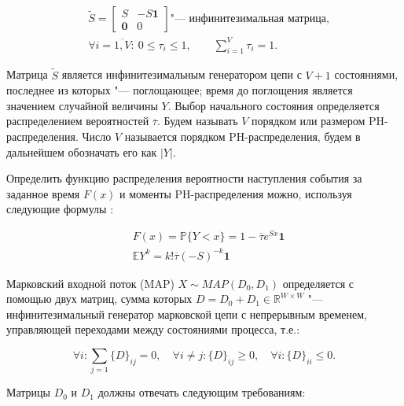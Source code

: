 \begin{equation}
	\label{eq:ch4-ph-def}
	\begin{aligned}
		&\tilde{S} = \begin{bmatrix}
			S  & -S\mathbf{1} \\
			\mathbf{0} &  0
		\end{bmatrix} \mbox{"--- инфинитезимальная матрица,}\\
		&\forall i = \overline{1,V}: \: 0 \leq \tau_i \leq 1, \qquad
			\sum\limits_{i=1}^{V} \tau_i = 1.
	\end{aligned}
\end{equation}


Матрица $\tilde{S}$ является инфинитезимальным генератором цепи с $V+1$ состояниями, последнее из которых "--- поглощающее; время до поглощения является значением случайной величины $Y$. Выбор начального состояния определяется распределением вероятностей $\overline{\tau}$. Будем называть $V$ порядком или размером PH-распределения. Число $V$ называется порядком PH-распределения, будем в дальнейшем обозначать его как $|Y|$.

Определить функцию распределения вероятности наступления события за заданное время $F(x)$ и моменты PH-распределения можно, используя следующие формулы \cite{VishnevskyDudin2018,Horvath2013}:

\begin{equation}
	\label{eq:ch4-ph-props}
	\begin{aligned}
		&F(x) = \mathbb{P}\{Y < x\} = 1 - \overline{\tau} e^{Sx} \mathbf{1}\\
		&\mathbb{E}Y^k = k! \overline{\tau} (-S)^{-k} \mathbf{1}
	\end{aligned}
\end{equation}



Марковский входной поток (MAP) \cite{Neuts1979, Dudin2000} $X \sim MAP(D_{0},D_{1})$ определяется с помощью двух матриц, сумма которых $D=D_{0}+D_{1} \in \mathbb{R}^{W \times W}$ "--- инфинитезимальный генератор марковской цепи с непрерывным временем, управляющей переходами между состояниями процесса, т.е.:

\begin{equation}
	\label{eq:ch4_infinitesimal_constraints}
	\forall i: \sum\limits_{j=1} \{D\}_{ij} = 0, \quad
	\forall i \neq j: \{D\}_{ij} \geq 0, \quad
	\forall i: \{D\}_{ii} \leq 0.
\end{equation}

Матрицы $D_{0}$ и $D_{1}$ должны отвечать следующим требованиям:

